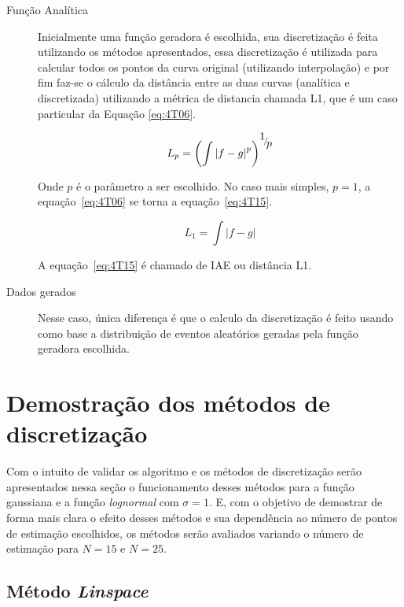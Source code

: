 \begin{description}
	\item[Função Analítica] Inicialmente uma função geradora é escolhida, sua discretização é feita utilizando os métodos apresentados, essa discretização é utilizada para calcular todos os pontos da curva original (utilizando interpolação) e por fim faz-se o cálculo da distância entre as duas curvas (analítica e discretizada) utilizando a métrica de distancia chamada L1, que é um caso particular da Equação \eqref{eq:4T06}.
	
	\begin{equation}\label{eq:4T06}
	{L_p} = {\left( {\int {{{\left| {f - g} \right|}^p}} } \right)^{{\raise0.7ex\hbox{$1$} \!\mathord{\left/
					{\vphantom {1 p}}\right.\kern-\nulldelimiterspace}
				\!\lower0.7ex\hbox{$p$}}}}
	\end{equation}
	
	Onde $p$ é o parâmetro a ser escolhido. No caso mais simples, $p=1$, a equação~\eqref{eq:4T06} se torna a equação~\eqref{eq:4T15}.
	
	\begin{equation}\label{eq:4T15}
	{L_1} = {\int {\left| {f - g} \right|} }
	\end{equation}
	
	A equação~\eqref{eq:4T15} é chamado de \ac{IAE} ou distância L1.
	
	\item[Dados gerados] Nesse caso, única diferença é que o calculo da discretização é feito usando como base a distribuição de eventos aleatórios geradas pela função geradora escolhida.
\end{description}


\section{Demostração dos métodos de discretização}

Com o intuito de validar os algoritmo e os métodos de discretização serão apresentados nessa seção o funcionamento desses métodos para a função gaussiana e a função \textit{lognormal} com $\sigma = 1$. E, com o objetivo de demostrar de forma mais clara o efeito desses métodos e sua dependência ao número de pontos de estimação escolhidos, os métodos serão avaliados variando o número de estimação para $ N = 15 $ e $ N = 25 $.

\subsection{Método \textit{Linspace}}


